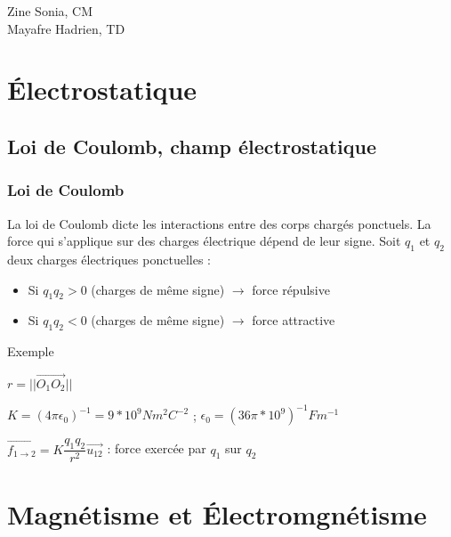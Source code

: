 Zine Sonia, CM\\
Mayafre Hadrien, TD\\
\chapter{Électrostatique}
\section{Loi de Coulomb, champ électrostatique}
\subsection{Loi de Coulomb}
La loi de Coulomb dicte les interactions entre des corps chargés ponctuels. La force qui s'applique sur des charges électrique dépend de leur signe. Soit $q_1$ et $q_2$ deux charges électriques ponctuelles : 
\begin{itemize}
    \item Si $q_1 q_2>0$ (charges de même signe) $\rightarrow$ force répulsive
    \item Si $q_1 q_2<0$ (charges de même signe) $\rightarrow$ force attractive
\end{itemize}

\begin{bclogo}[logo=\bccrayon,noborder=true,barre=snake]{Exemple}
\begin{minipage}{0.3\textwidth}
\end{minipage}
\begin{minipage}{0.7\textwidth}
$r=||\overrightarrow{O_1 O_2}||$

$K=(4\pi \epsilon_0)^{-1}=9*10^9 Nm^2C^{-2}$ ; $\epsilon_0 = (36\pi*10^9)^{-1} Fm^{-1}$

\textbf{$\overrightarrow{f_{1\rightarrow2}}=K\dfrac{q_1 q_2}{r^2}\overrightarrow{u_{12}}$} : force exercée par $q_1$ sur $q_2$
\end{minipage}
\end{bclogo}

\chapter{Magnétisme et Électromgnétisme}



